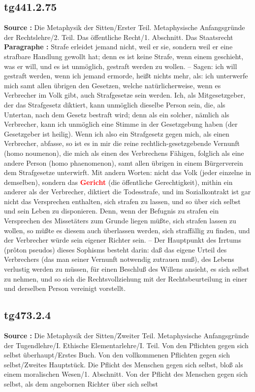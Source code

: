 \documentclass[a4paper,12pt,twoside]{book}
\newcommand{\match}[1]{\textcolor{red}{\textbf{#1}}}
\begin{document}
	\subsection*{tg441.2.75} 
	\textbf{Source : }Die Metaphysik der Sitten/Erster Teil. Metaphysische Anfangsgründe der Rechtslehre/2. Teil. Das öffentliche Recht/1. Abschnitt. Das Staatsrecht\\  
	
	\textbf{Paragraphe : }Strafe erleidet jemand nicht, weil er sie, sondern weil er eine strafbare Handlung gewollt hat; denn es ist keine Strafe, wenn einem geschieht, was er will, und es ist unmöglich, gestraft werden zu wollen. – Sagen: ich will gestraft werden, wenn ich jemand ermorde, heißt nichts mehr, als: ich unterwerfe mich samt allen übrigen den Gesetzen, welche natürlicherweise, wenn es Verbrecher im Volk gibt, auch Strafgesetze sein werden. Ich, als Mitgesetzgeber, der das Strafgesetz diktiert, kann unmöglich dieselbe Person sein, die, als Untertan, nach dem Gesetz bestraft wird; denn als ein solcher, nämlich als Verbrecher, kann ich unmöglich eine Stimme in der Gesetzgebung haben (der Gesetzgeber ist heilig). Wenn ich also ein Strafgesetz gegen mich, als einen Verbrecher, abfasse, so ist es in mir die reine rechtlich-gesetzgebende Vernunft (homo noumenon), die mich als einen des Verbrechens Fähigen, folglich als eine andere Person (homo phaenomenon), samt allen übrigen in einem Bürgerverein dem Strafgesetze unterwirft. Mit andern Worten: nicht das Volk (jeder einzelne in demselben), sondern das \match{Gericht} (die öffentliche Gerechtigkeit), mithin ein anderer als der Verbrecher, diktiert die Todesstrafe, und im Sozialkontrakt ist gar nicht das Versprechen enthalten, sich strafen zu lassen, und so über sich selbst und sein Leben zu disponieren. Denn, wenn der Befugnis zu strafen ein Versprechen des Missetäters zum Grunde liegen müßte, sich  strafen lassen zu wollen, so müßte es diesem auch überlassen werden, sich straffällig zu finden, und der Verbrecher würde sein eigener Richter sein. – Der Hauptpunkt des Irrtums (prôton pseudos) dieses Sophisms besteht darin: daß das eigene Urteil des Verbrechers (das man seiner Vernunft notwendig zutrauen muß), des Lebens verlustig werden zu müssen, für einen Beschluß des Willens ansieht, es sich selbst zu nehmen, und so sich die Rechtsvollziehung mit der Rechtsbeurteilung in einer und derselben Person vereinigt vorstellt. 
	
	\subsection*{tg473.2.4} 
	\textbf{Source : }Die Metaphysik der Sitten/Zweiter Teil. Metaphysische Anfangsgründe der Tugendlehre/I. Ethische Elementarlehre/I. Teil. Von den Pflichten gegen sich selbst überhaupt/Erstes Buch. Von den vollkommenen Pflichten gegen sich selbst/Zweites Hauptstück. Die Pflicht des Menschen gegen sich selbst, bloß als einem moralischen Wesen/1. Abschnitt. Von der Pflicht des Menschen gegen sich selbst, als dem angebornen Richter über sich selbst\\  
	
\end{document}
